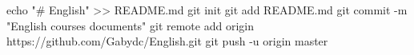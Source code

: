 echo "# English" >> README.md
git init
git add README.md
git commit -m "English courses documents"
git remote add origin https://github.com/Gabydc/English.git
git push -u origin master